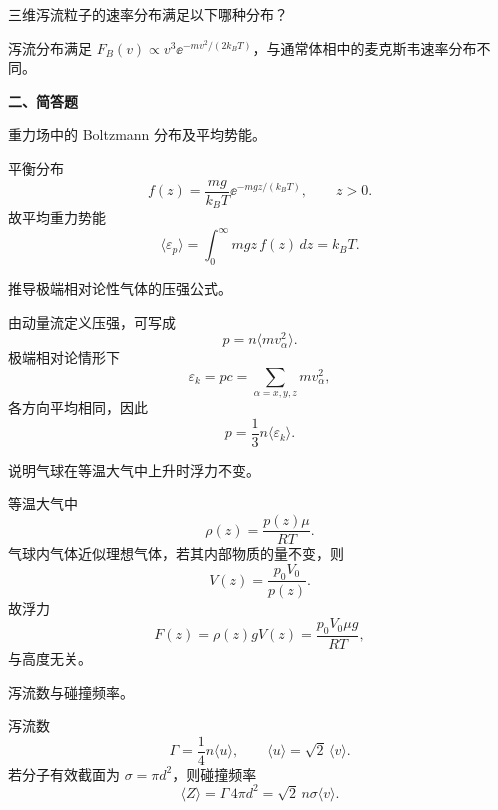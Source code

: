 \begin{question}
三维泻流粒子的速率分布满足以下哪种分布？
\begin{choiceoptions}
\end{choiceoptions}
\begin{solution}
泻流分布满足 $F_B(v)\propto v^3\ee^{-mv^2/(2k_BT)}$，与通常体相中的麦克斯韦速率分布不同。
\end{solution}
\end{question}

\textbf{二、简答题}
\begin{question}
重力场中的 Boltzmann 分布及平均势能。
\begin{solution}
平衡分布
\[
f(z)=\frac{mg}{k_BT}\ee^{-mgz/(k_BT)},\qquad z>0.
\]
故平均重力势能
\[
\langle \varepsilon_p\rangle=\int_0^{\infty} mgz\,f(z)\,dz=k_BT.
\]
\end{solution}
\end{question}

\begin{question}
推导极端相对论性气体的压强公式。
\begin{solution}
由动量流定义压强，可写成
\[
p=n\langle mv_\alpha^2\rangle.
\]
极端相对论情形下
\[
\varepsilon_k=pc=\sum_{\alpha=x,y,z}mv_\alpha^2,
\]
各方向平均相同，因此
\[
p=\frac13 n\langle \varepsilon_k\rangle.
\]
\end{solution}
\end{question}

\begin{question}
说明气球在等温大气中上升时浮力不变。
\begin{solution}
等温大气中
\[
\rho(z)=\frac{p(z)\mu}{RT}.
\]
气球内气体近似理想气体，若其内部物质的量不变，则
\[
V(z)=\frac{p_0V_0}{p(z)}.
\]
故浮力
\[
F(z)=\rho(z)gV(z)=\frac{p_0V_0\mu g}{RT},
\]
与高度无关。
\end{solution}
\end{question}

\begin{question}
泻流数与碰撞频率。
\begin{solution}
泻流数
\[
\Gamma=\frac14 n\langle u\rangle,
\qquad \langle u\rangle=\sqrt2\,\langle v\rangle.
\]
若分子有效截面为 $\sigma=\pi d^2$，则碰撞频率
\[
\langle Z\rangle=\Gamma\,4\pi d^2
=\sqrt2\,n\sigma\langle v\rangle.
\]
\end{solution}
\end{question}

